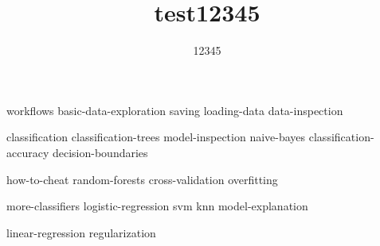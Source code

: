 \documentclass[symmetric, justified, a4paper]{tufte-book}
\title{test12345}
\author[Test123]{12345}
\begin{document}
\frontmatter

\maketitle



\tableofcontents

%

\mainmatter



{workflows}
{basic-data-exploration}
{saving}
{loading-data}
{data-inspection}


 {classification}
 {classification-trees}
 {model-inspection}
 {naive-bayes}
 {classification-accuracy}
 {decision-boundaries}

 {how-to-cheat}
 {random-forests}
 {cross-validation}
 {overfitting}


{more-classifiers}
{logistic-regression}
{svm}
{knn}
{model-explanation}


 {linear-regression}
{regularization}
\end{document}
